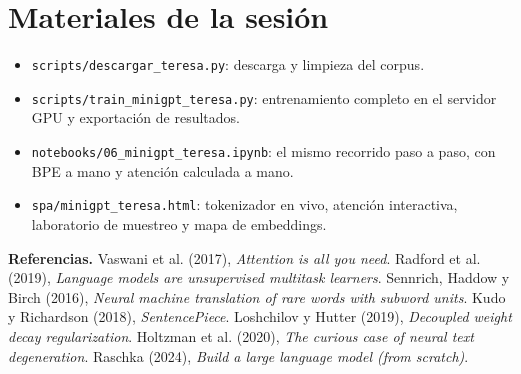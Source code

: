 \documentclass[11pt,letterpaper,oneside]{report}
\begin{document}
\section*{Materiales de la sesión}
\begin{itemize}
  \item \texttt{scripts/descargar\_teresa.py}: descarga y limpieza del corpus.
  \item \texttt{scripts/train\_minigpt\_teresa.py}: entrenamiento completo en el servidor GPU y exportación de resultados.
  \item \texttt{notebooks/06\_minigpt\_teresa.ipynb}: el mismo recorrido paso a paso, con BPE a mano y atención calculada a mano.
  \item \texttt{spa/minigpt\_teresa.html}: tokenizador en vivo, atención interactiva, laboratorio de muestreo y mapa de embeddings.
\end{itemize}

\textbf{Referencias.} Vaswani et al. (2017), \emph{Attention is all you need}. Radford et al. (2019), \emph{Language models are unsupervised multitask learners}. Sennrich, Haddow y Birch (2016), \emph{Neural machine translation of rare words with subword units}. Kudo y Richardson (2018), \emph{SentencePiece}. Loshchilov y Hutter (2019), \emph{Decoupled weight decay regularization}. Holtzman et al. (2020), \emph{The curious case of neural text degeneration}. Raschka (2024), \emph{Build a large language model (from scratch)}.
\end{document}
